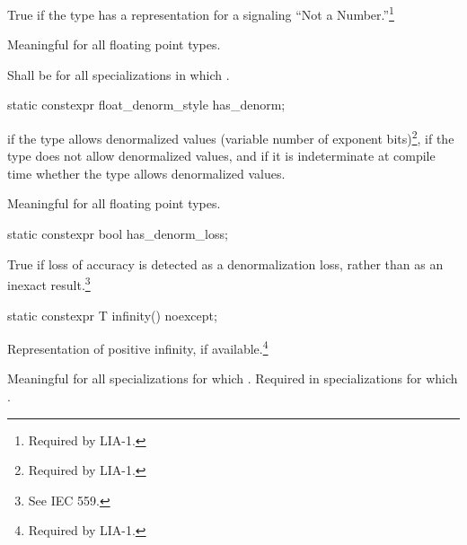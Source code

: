 \begin{itemdescr}
\pnum
True if the type has a representation for a signaling ``Not a Number.''\footnote{Required by LIA-1.}

\pnum
Meaningful for all floating point types.

\pnum
Shall be
for all specializations in which
.
\end{itemdescr}

\begin{itemdecl}
static constexpr float_denorm_style has_denorm;
\end{itemdecl}

\begin{itemdescr}
\pnum
{}
if the type allows denormalized values
(variable number of exponent bits)\footnote{Required by LIA-1.},
if the type does not allow denormalized values,
and
if it is indeterminate at compile time whether the type allows
denormalized values.

\pnum
Meaningful for all floating point types.
\end{itemdescr}

\begin{itemdecl}
static constexpr bool has_denorm_loss;
\end{itemdecl}

\begin{itemdescr}
\pnum
True if loss of accuracy is detected as a
denormalization loss, rather than as an inexact result.\footnote{See IEC 559.}
\end{itemdescr}

\begin{itemdecl}
static constexpr T infinity() noexcept;
\end{itemdecl}

\begin{itemdescr}
\pnum
Representation of positive infinity, if available.\footnote{Required by LIA-1.}

\pnum
Meaningful for all specializations for which
.
Required in specializations for which
.
\end{itemdescr}


